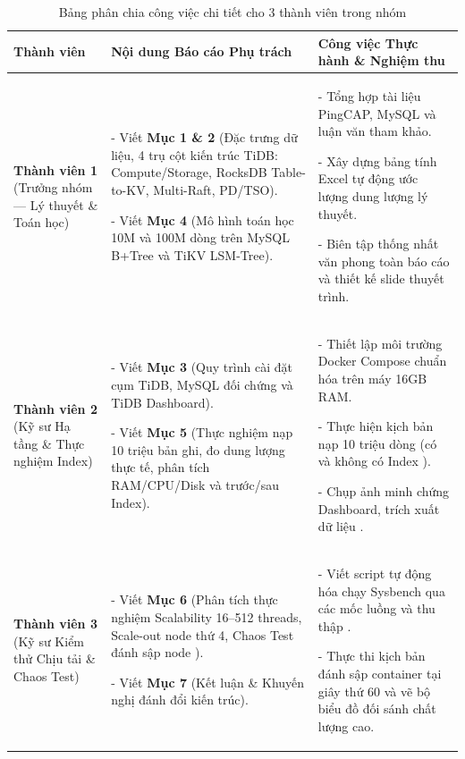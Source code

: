 \begin{table}[H]
\centering
\caption{Bảng phân chia công việc chi tiết cho 3 thành viên trong nhóm}
\label{tab:work_breakdown_table}
\bangfont
\begin{tabularx}{\linewidth}{@{}>{\raggedright\arraybackslash}p{3.8cm}>{\raggedright\arraybackslash}p{4.8cm}Y@{}}
\toprule
\textbf{Thành viên} & \textbf{Nội dung Báo cáo Phụ trách} & \textbf{Công việc Thực hành \& Nghiệm thu}\\
\midrule
\textbf{Thành viên 1} (Trưởng nhóm --- Lý thuyết \& Toán học) &
- Viết \textbf{Mục 1 \& 2} (Đặc trưng dữ liệu, 4 trụ cột kiến trúc TiDB: Compute/Storage, RocksDB Table-to-KV, Multi-Raft, PD/TSO).\par
- Viết \textbf{Mục 4} (Mô hình toán học 10M và 100M dòng trên MySQL B+Tree và TiKV LSM-Tree). &
- Tổng hợp tài liệu PingCAP, MySQL và luận văn tham khảo.\par
- Xây dựng bảng tính Excel tự động ước lượng dung lượng lý thuyết.\par
- Biên tập thống nhất văn phong toàn báo cáo và thiết kế slide thuyết trình.\\
\midrule
\textbf{Thành viên 2} (Kỹ sư Hạ tầng \& Thực nghiệm Index) &
- Viết \textbf{Mục 3} (Quy trình cài đặt cụm TiDB, MySQL đối chứng và TiDB Dashboard).\par
- Viết \textbf{Mục 5} (Thực nghiệm nạp 10 triệu bản ghi, đo dung lượng thực tế, phân tích RAM/CPU/Disk và  trước/sau Index). &
- Thiết lập môi trường Docker Compose chuẩn hóa trên máy 16GB RAM.\par
- Thực hiện kịch bản nạp 10 triệu dòng (có và không có Index ).\par
- Chụp ảnh minh chứng Dashboard, trích xuất dữ liệu .\\
\midrule
\textbf{Thành viên 3} (Kỹ sư Kiểm thử Chịu tải \& Chaos Test) &
- Viết \textbf{Mục 6} (Phân tích thực nghiệm Scalability 16--512 threads, Scale-out node thứ 4, Chaos Test đánh sập node ).\par
- Viết \textbf{Mục 7} (Kết luận \& Khuyến nghị đánh đổi kiến trúc). &
- Viết script tự động hóa chạy Sysbench qua các mốc luồng và thu thập .\par
- Thực thi kịch bản đánh sập container  tại giây thứ 60 và vẽ bộ biểu đồ đối sánh chất lượng cao.\\
\bottomrule
\end{tabularx}
\end{table}
